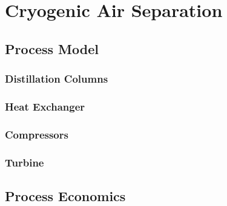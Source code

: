 \chapter{Cryogenic Air Separation}
\label{chp:cryo}

\section{Process Model}
\label{sec:asu_model}

\subsection{Distillation Columns}

\subsection{Heat Exchanger}

\subsection{Compressors}

\subsection{Turbine}

\section{Process Economics}
\label{sec:uncertainty}

